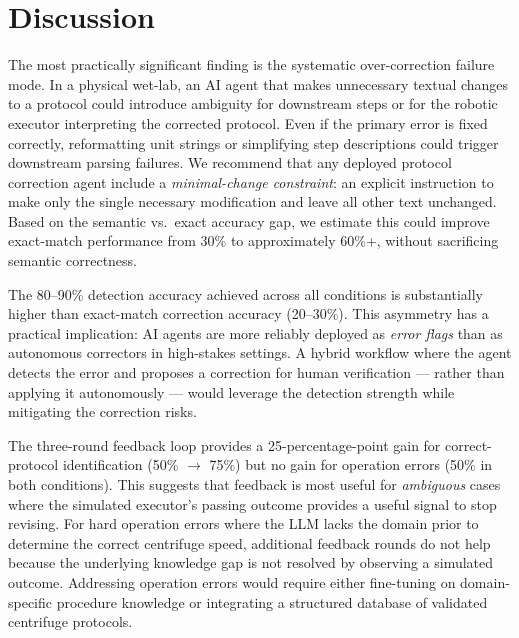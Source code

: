 \section{Discussion}
\label{sec:discussion}

The most practically significant finding is the systematic over-correction failure mode.
In a physical wet-lab, an AI agent that makes unnecessary textual changes to a protocol could introduce ambiguity for downstream steps or for the robotic executor interpreting the corrected protocol.
Even if the primary error is fixed correctly, reformatting unit strings or simplifying step descriptions could trigger downstream parsing failures.
We recommend that any deployed protocol correction agent include a \emph{minimal-change constraint}: an explicit instruction to make only the single necessary modification and leave all other text unchanged.
Based on the semantic vs.\ exact accuracy gap, we estimate this could improve exact-match performance from 30\% to approximately 60\%+, without sacrificing semantic correctness.

The 80--90\% detection accuracy achieved across all conditions is substantially higher than exact-match correction accuracy (20--30\%).
This asymmetry has a practical implication: AI agents are more reliably deployed as \emph{error flags} than as autonomous correctors in high-stakes settings.
A hybrid workflow where the agent detects the error and proposes a correction for human verification --- rather than applying it autonomously --- would leverage the detection strength while mitigating the correction risks.

The three-round feedback loop provides a 25-percentage-point gain for correct-protocol identification (50\% $\to$ 75\%) but no gain for operation errors (50\% in both conditions).
This suggests that feedback is most useful for \emph{ambiguous} cases where the simulated executor's passing outcome provides a useful signal to stop revising.
For hard operation errors where the LLM lacks the domain prior to determine the correct centrifuge speed, additional feedback rounds do not help because the underlying knowledge gap is not resolved by observing a simulated outcome.
Addressing operation errors would require either fine-tuning on domain-specific procedure knowledge or integrating a structured database of validated centrifuge protocols.

